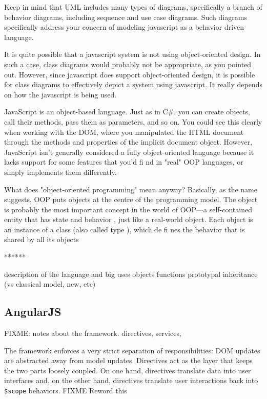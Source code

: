 Keep in mind that UML includes many types of diagrams, specifically a branch of behavior diagrams, including sequence and use case diagrams. Such diagrams specifically address your concern of modeling javascript as a behavior driven language.

It is quite possible that a javascript system is not using object-oriented design. In such a case, class diagrams would probably not be appropriate, as you pointed out. However, since javascript does support object-oriented design, it is possible for class diagrams to effectively depict a system using javascript. It really depends on how the javascript is being used.

JavaScript is an
object-based
language. Just as in C\#, you can create objects, call their
methods, pass them as parameters, and so on. You could see this clearly when working
with the DOM, where you manipulated the HTML document through the methods
and properties of the implicit
document
object. However, JavaScript isn't generally
considered a fully object-oriented language because it lacks support for some features
that you'd
fi
nd in "real" OOP languages, or simply implements them differently.

 What does "object-oriented programming" mean anyway? Basically, as the name
suggests, OOP puts objects at the centre of the programming model. The
object
is
probably the most important concept in the world of OOP—a self-contained entity
that has
state
and
behavior
, just like a real-world object. Each object is an instance of a
class
(also called
type
), which de
fi
nes the behavior that is shared by all its objects


******

description of the language and big uses
objects
functions
prototypal inheritance (vs classical model, new, etc)


\subsection{AngularJS}
FIXME: notes about the framework. directives, services, 

The framework enforces a very strict separation of responsibilities: \ac{DOM} updates are abstracted away from model updates. 
Directives act as the layer that keeps the two parts loosely coupled.
On one hand, directives translate data into user interfaces and, on the other hand, directives translate user interactions back into \texttt{\$scope} behaviors. FIXME Reword this

